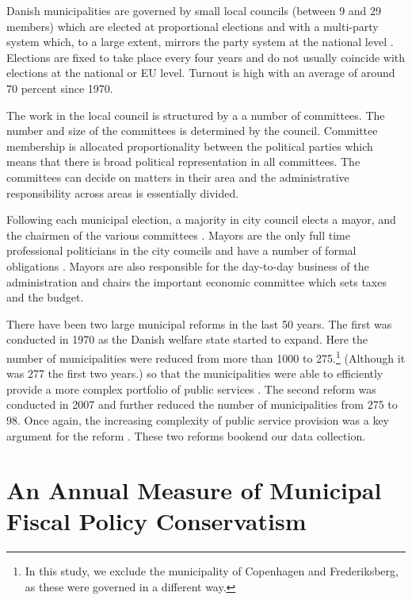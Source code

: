 \documentclass[a4paper,12pt]{article}
\begin{document}
Danish municipalities are governed by small local councils (between 9 and 29 members) which are elected at proportional elections and with a multi-party system which, to a large extent, mirrors the party system at the national level \citep{blom2013et}. Elections are fixed to take place every four years and do not usually coincide with elections at the national or EU level. Turnout is high with an average of around 70 percent since 1970. 

The work in the local council is structured by a a number of committees. The number and size of the committees is determined by the council. Committee membership is allocated proportionality between the political parties which means that there is broad political representation in all committees. The committees can decide on matters in their area and the administrative responsibility across areas is essentially divided. 

Following each municipal election, a majority in city council elects a mayor, and the chairmen of the various committees \citep{serritzlew2008explaining}. Mayors are the only full time professional politicians in the city councils and have a number of formal obligations \citep{kjaer2015urban}. Mayors are also responsible for the day-to-day business of the administration and chairs the important economic committee which sets taxes and the budget.


There have been two large municipal reforms in the last 50 years. The first was conducted in 1970 as the Danish welfare state started to expand. Here the number of municipalities were reduced from more than 1000 to 275.\footnote{In this study, we exclude the municipality of Copenhagen and Frederiksberg, as these were governed in a different way.} (Although it was 277 the first two years.) so that the municipalities were able to efficiently provide a more complex portfolio of public services \citep{ingvartsen1991kommunalreformen}. The second reform was conducted in 2007 and further reduced the number of municipalities from 275 to 98. Once again, the increasing complexity of public service provision was a key argument for the reform \citep{christiansen2008utaenkelige}. These two reforms bookend our data collection.





\section{An Annual Measure of Municipal Fiscal Policy Conservatism}
\end{document}
